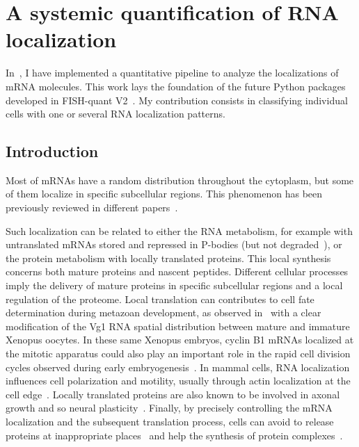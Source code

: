 \section{A systemic quantification of RNA localization}
\label{sec:general_pattern_recognition}

In~\cite{CHOUAIB_2020}, I have implemented a quantitative pipeline to analyze the localizations of \ac{mRNA} molecules.
This work lays the foundation of the future Python packages developed in FISH-quant V2~\cite{Imbert_fq_2022}.
My contribution consists in classifying individual cells with one or several \ac{RNA} localization patterns.

\subsection{Introduction}
\label{subsec:introduction_general_pattern}

Most of \ac{mRNA}s have a random distribution throughout the cytoplasm, but some of them localize in specific subcellular regions.
This phenomenon has been previously reviewed in different papers~\cite{Blower_2013, Jung_2014, Eliscovich_2017, Bovaird_2018}.

Such localization can be related to either the \ac{RNA} metabolism, for example with untranslated \ac{mRNA}s stored and repressed in \ac{P-bodies} (but not degraded~\cite{Hubstenberger_2017}), or the protein metabolism with locally translated proteins.
This local synthesis concerns both mature proteins and nascent peptides.
Different cellular processes imply the delivery of mature proteins in specific subcellular regions and a local regulation of the proteome.
Local translation can contributes to cell fate determination during metazoan development, as observed in~\cite{melton_translocation_1987} with a clear modification of the Vg1 \ac{RNA} spatial distribution between mature and immature Xenopus oocytes.
In these same Xenopus embryos, cyclin B1 \ac{mRNA}s localized at the mitotic apparatus could also play an important role in the rapid cell division cycles observed during early embryogenesis~\cite{Groisman_2000}.
In mammal cells, \ac{RNA} localization influences cell polarization and motility, usually through actin localization at the cell edge~\cite{Lawrence_1986}.
Locally translated proteins are also known to be involved in axonal growth and so neural plasticity~\cite{VanDriesche_2018}.
Finally, by precisely controlling the \ac{mRNA} localization and the subsequent translation process, cells can avoid to release proteins at inappropriate places~\cite{Muller_myelin_2013} and help the synthesis of protein complexes~\cite{pichon_visualization_2016}.

